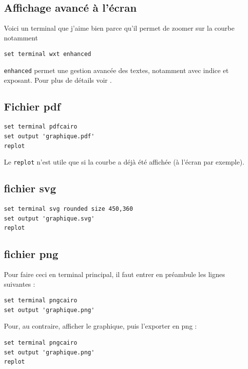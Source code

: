 \documentclass[a4paper,twoside]{article}
\begin{document}
\subsection{Affichage avancé à l'écran}
Voici un terminal que j'aime bien parce qu'il permet de zoomer sur la courbe notamment

\begin{verbatim}
set terminal wxt enhanced
\end{verbatim}

\begin{remarque}
\texttt{enhanced} permet une gestion avancée des textes, notamment avec indice et exposant. Pour plus de détails voir .
\end{remarque}


\subsection{Fichier pdf}
\begin{verbatim}
set terminal pdfcairo
set output 'graphique.pdf'
replot
\end{verbatim}

\begin{remarque}
Le \texttt{replot} n'est utile que si la courbe a déjà été affichée (à l'écran par exemple).
\end{remarque}

\subsection{fichier svg}
\begin{verbatim}
set terminal svg rounded size 450,360
set output 'graphique.svg'
replot
\end{verbatim}

\subsection{fichier png}
Pour faire ceci en terminal principal, il faut entrer en préambule les lignes suivantes :
\begin{verbatim}
set terminal pngcairo
set output 'graphique.png'
\end{verbatim}

Pour, au contraire, afficher le graphique, puis l'exporter en png : 
\begin{verbatim}
set terminal pngcairo
set output 'graphique.png'
replot
\end{verbatim}
\end{document}
